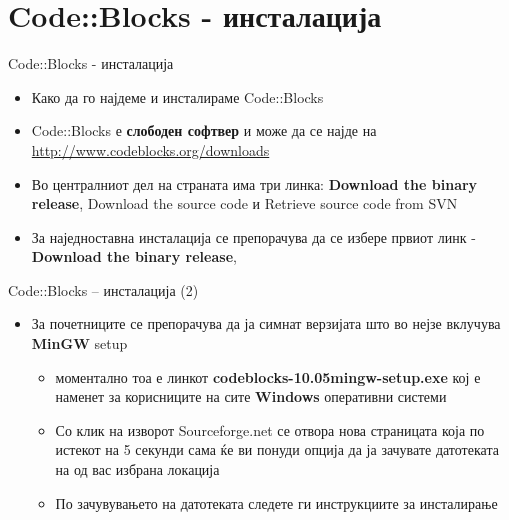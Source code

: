 \section{Code::Blocks - инсталација}
\begin{frame}{Code::Blocks - инсталација}
\begin{itemize}
  \item Како да го најдеме и инсталираме Code::Blocks
  \item Code::Blocks е \textbf{слободен софтвер} и може да се најде
  на\linebreak
  \href{http://www.codeblocks.org/downloads}{http://www.codeblocks.org/downloads}
  \item Во централниот дел на страната има три линка: \textbf{Download the binary release}, Download the source code и Retrieve source code from SVN
  \item За наједноставна инсталација се препорачува да се избере првиот линк -
  \textbf{Download the binary release},
\end{itemize}
\end{frame}

\begin{frame}{Code::Blocks – инсталација (2)}
\begin{itemize}
  \item За почетниците се препорачува да ја симнат верзијата што во нејзе
  вклучува \textbf{MinGW} setup
    \begin{itemize}
  \item моментално тоа е линкот \textbf{codeblocks-10.05mingw-setup.exe} кој е наменет за
  корисниците на сите \textbf{Windows} оперативни системи
  \item Со клик на изворот Sourceforge.net се отвора нова страницата која по
  истекот на 5 секунди сама ќе ви понуди опција да ја зачувате датотеката на од вас избрана локација
  \item По зачувувањето на датотеката следете ги инструкциите за инсталирање
    \end{itemize}
\end{itemize}
\end{frame}

